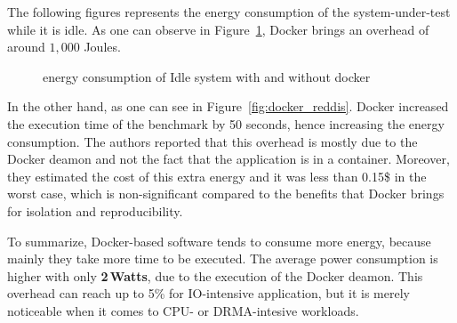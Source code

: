 The following figures represents the energy consumption of the system-under-test while it is idle.
As one can observe in Figure~\ref{fig:docker_idle}, Docker brings an overhead of around $1,000$ Joules.

\begin{figure}
    \caption{energy consumption of Idle system with and without docker \cite{santos2018does}}\label{fig:docker_idle}
\end{figure}

In the other hand, as one can see in Figure~\ref{fig:docker_reddis}.
Docker increased the execution time of the benchmark by 50 seconds, hence increasing the energy consumption.
The authors reported that this overhead is mostly due to the Docker deamon and not the fact that the application is in a container.
Moreover, they estimated the cost of this extra energy and it was less than 0.15\$ in the worst case, which is non-significant compared to the benefits that Docker brings for isolation and reproducibility.

To summarize, Docker-based software tends to consume more energy, because mainly they take more time to be executed.
The average power consumption is higher with only \textbf{2\,Watts}, due to the execution of the Docker deamon.
This overhead can reach up to 5\% for IO-intensive application, but it is merely noticeable when it comes to CPU- or DRMA-intesive workloads.

